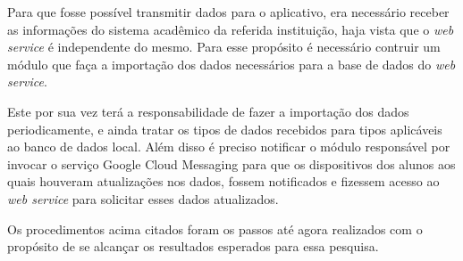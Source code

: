 	\par Para que fosse possível transmitir dados para o aplicativo, era
necessário receber as informações do sistema acadêmico da referida instituição,
haja vista que o \textit{web service} é independente do mesmo. Para esse
propósito é necessário  contruir um módulo que faça a importação dos dados
necessários para a base de dados do \textit{web service}. 

	\par Este por sua vez terá a responsabilidade de fazer a importação dos dados
periodicamente, e ainda tratar os tipos de dados recebidos para tipos
aplicáveis ao banco de dados local. Além disso é preciso notificar o módulo
responsável por invocar o serviço Google Cloud Messaging para que os
dispositivos dos alunos aos quais houveram atualizações nos dados, fossem
notificados e fizessem acesso ao \textit{web service} para solicitar esses
dados atualizados.

	\par Os procedimentos acima citados foram os passos até agora realizados com o
propósito de se alcançar os resultados esperados para essa pesquisa.






